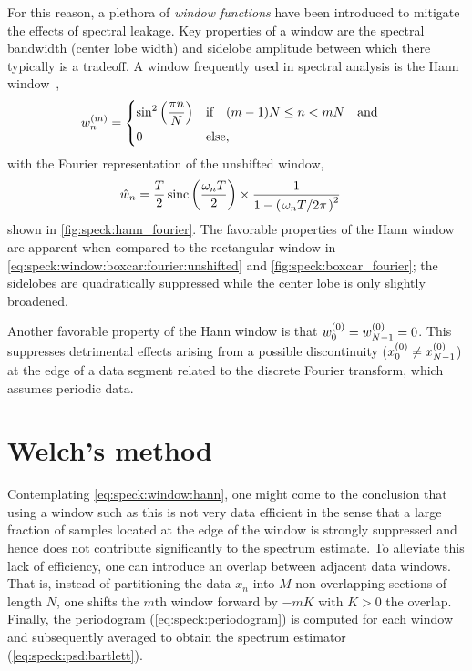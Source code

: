 For this reason, a plethora of \emph{window functions} have been introduced to mitigate the effects of spectral leakage.
Key properties of a window are the spectral bandwidth (center lobe width) and sidelobe amplitude between which there typically is a tradeoff.
A window frequently used in spectral analysis is the Hann window~\cite{Nuttall1981},
\begin{align}\label{eq:speck:window:hann}
    w_n\gth{m} =
    \begin{dcases}
        \sin^2\left(\frac{\pi n}{N}\right) &\qif* (m - 1)N\leq n < mN\qand \\
        0 &\text{else},
    \end{dcases}
\end{align}
with the Fourier representation of the unshifted window,
\begin{align}\label{eq:speck:window:hann:fourier_unshifted}
    \hat{w}_n &= \frac{T}{2}\sinc\left(\frac{\omega_n T}{2}\right)\times
                    \frac{1}{1 - \left(\flatfrac{\omega_n T}{2\pi}\right)^2}
\end{align}
shown in \cref{fig:speck:hann_fourier}.
The favorable properties of the Hann window are apparent when compared to the rectangular window in \cref{eq:speck:window:boxcar:fourier:unshifted} and \cref{fig:speck:boxcar_fourier}; the sidelobes are quadratically suppressed while the center lobe is only slightly broadened.

Another favorable property of the Hann window is that $w_0^{(0)} = w_{N-1}^{(0)} = 0$.
This suppresses detrimental effects arising from a possible discontinuity ($x_0^{(0)}\neq x_{N-1}^{(0)}$) at the edge of a data segment related to the discrete Fourier transform, which assumes periodic data.

\section{Welch's method}\label{sec:speck:theory:welch}
Contemplating \cref{eq:speck:window:hann}, one might come to the conclusion that using a window such as this is not very data efficient in the sense that a large fraction of samples located at the edge of the window is strongly suppressed and hence does not contribute significantly to the spectrum estimate.
To alleviate this lack of efficiency, one can introduce an overlap between adjacent data windows.
That is, instead of partitioning the data $x_n$ into $M$ non-overlapping sections of length $N$, one shifts the $m$th window forward by $-mK$ with $K>0$ the overlap.
Finally, the periodogram (\cref{eq:speck:periodogram}) is computed for each window and subsequently averaged to obtain the spectrum estimator (\cref{eq:speck:psd:bartlett}).

